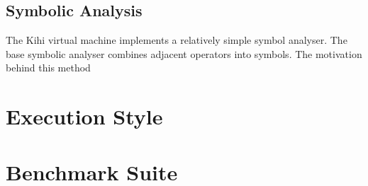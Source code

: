 \subsection{Symbolic Analysis}
The Kihi virtual machine implements a relatively simple symbol analyser.
The base symbolic analyser combines adjacent operators into symbols. The
motivation behind this method

\section{Execution Style}


\section{Benchmark Suite}


